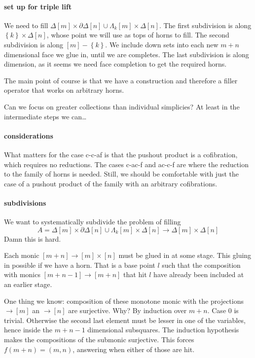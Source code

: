 \documentclass{tac}
\newcommand\set[1]{\left\{#1\right\}}
\newcommand\simplex\Delta
\newcommand\cycle{\partial\Delta}
\newcommand\horn\Lambda
\begin{document}
\paragraph{set up for triple lift}
We need to fill $\simplex[m]\times \cycle[n]\cup \horn_k[m]\times\simplex[n]$. The first subdivision is along $\set{k}\times \simplex[n]$, whose point we will use as tops of horns to fill. The second subdivision is along $[m]-\set{k}$. We include down sets into each new $m+n$ dimensional face we glue in, until we are completes. The last subdivision is along dimension, as it seems we need face completion to get the required horns.

The main point of course is that we have a construction and therefore a filler operator that works on arbitrary horns.

Can we focus on greater collections than individual simplicies? At least in the intermediate steps we can\dots

\paragraph{considerations}
What matters for the case c-c-af is that the pushout product is a cofibration, which requires no reductions.
The cases c-ac-f and ac-c-f are where the reduction to the family of horns is needed.
Still, we should be comfortable with just the case of a pushout product of the family with an arbitrary cofibrations.

\paragraph{subdivisions}
We want to systematically subdivide the problem of filling
\[ A = \simplex[m]\times \cycle[n]\cup \horn_k[m]\times\simplex[n] \to \simplex[m]\times \simplex[n] \]
Damn this is hard.

Each monic $[m+n]\to [m]\times [n]$ must be glued in at some stage. This gluing in possible if we have a horn.
That is a base point $l$ such that the composition with monics $[m+n-1]\to [m+n]$ that hit $l$ have already been included at an earlier stage.

One thing we know: composition of these monotone monic with the projections $\to[m]$ an $\to[n]$ are surjective. Why?
By induction over $m+n$. Case 0 is trivial. Otherwise the second last element must be lesser in one of the variables,
hence inside the $m+n-1$ dimensional subsquares. The induction hypothesis makes the compositions of the submonic surjective. This forces $f(m+n) = (m,n)$, answering when either of those are hit.
\end{document}
